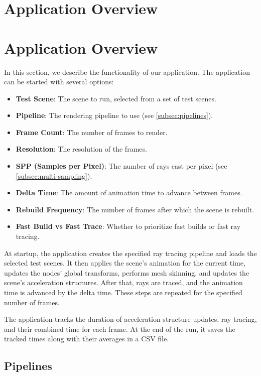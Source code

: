 
\section{Application Overview}

\section{Application Overview}

In this section, we describe the functionality of our application. The application can be started with several options:

\begin{itemize}
\item \textbf{Test Scene}: The scene to run, selected from a set of test scenes.
\item \textbf{Pipeline}: The rendering pipeline to use (see \autoref{subsec:pipelines}).
\item \textbf{Frame Count}: The number of frames to render.
\item \textbf{Resolution}: The resolution of the frames.
\item \textbf{SPP (Samples per Pixel)}: The number of rays cast per pixel (see \autoref{subsec:multi-sampling}).
\item \textbf{Delta Time}: The amount of animation time to advance between frames.
\item \textbf{Rebuild Frequency}: The number of frames after which the scene is rebuilt.
\item \textbf{Fast Build vs Fast Trace}: Whether to prioritize fast builds or fast ray tracing.
\end{itemize}

At startup, the application creates the specified ray tracing pipeline and loads the selected test scenes. It then applies the scene's animation for the current time, updates the nodes' global transforms, performs mesh skinning, and updates the scene's acceleration structures. After that, rays are traced, and the animation time is advanced by the delta time. These steps are repeated for the specified number of frames.

The application tracks the duration of acceleration structure updates, ray tracing, and their combined time for each frame. At the end of the run, it saves the tracked times along with their averages in a CSV file.

\subsection{Pipelines}\label{subsec:pipelines}

